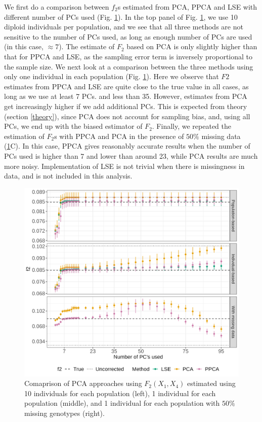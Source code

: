 \documentclass[12pt, letterpaper]{article}
\begin{document}
We first do a comparison between $f_2$s estimated from PCA, PPCA and LSE with different number of PCs used (Fig. \ref{fig:comparison}). In the top panel of Fig. \ref{fig:comparison}, we use 10 diploid individuals per population, and we see that all three methods are not sensitive to the number of PCs used, as long as enough number of PCs are used (in this case, $\approx 7$). The estimate of $F_2$ based on PCA is only slightly higher than that for PPCA and LSE, as the sampling error term is inversely proportional to the sample size. We next look at a comparison between the three methods using only one individual in each population (Fig. \ref{fig:comparison}). Here we observe that $F2$ estimates from PPCA and LSE are quite close to the true value in all cases, as long as we use at least 7 PCs. and less than 35. However, estimates from PCA get increasingly higher if we add additional PCs. This is expected from theory (section \ref{theory}), since PCA does not account for sampling bias, and, using all PCs, we end up with the biased estimator of $F_2$. Finally, we repeated the estimation of $F_2$s with PPCA and PCA in the presence of $50\%$ missing data (\ref{fig:comparison}C). In this case, PPCA gives reasonably accurate results when the number of PCs used is higher than 7 and lower than around 23, while PCA results are much more noisy. Implementation of LSE is not trivial when there is missingness in data, and is not included in this analysis. 


\begin{figure}[ht!]
    \includegraphics[width=16.5cm]{plots/simfiles_Ne1000_split_times1000/npop10_nind100/missing0.5/mu0.05_main_fig_all_pca.png}
    \centering
    \caption{Comaprison of PCA approaches using $F_2(X_1,X_4)$ estimated using 10 individuals for each population (left), 1 individual for each population (middle), and 1 individual for each population with $50\%$ missing genotypes (right).}
    \label{fig:comparison}
\end{figure}
\end{document}
